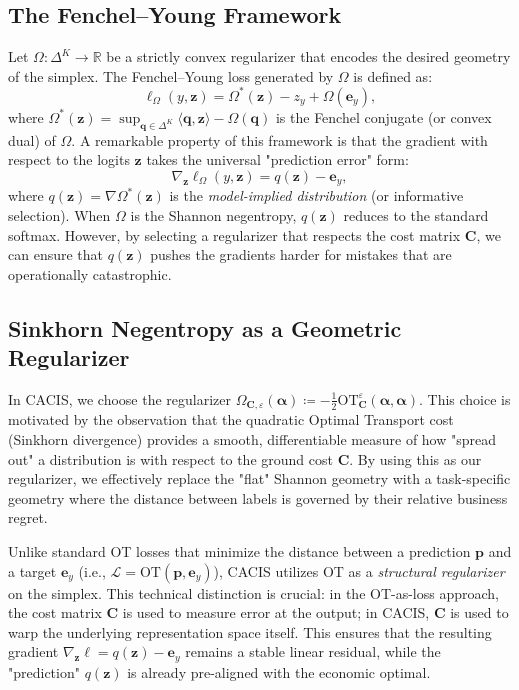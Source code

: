 \documentclass[sigconf,anonymous]{acmart}
\newcommand{\CACIS}{\textsc{CACIS}}
\newcommand{\vz}{\mathbf{z}}
\newcommand{\vp}{\mathbf{p}}
\newcommand{\vq}{\mathbf{q}}
\newcommand{\valpha}{\bm{\alpha}}
\newcommand{\mC}{\mathbf{C}}
\newcommand{\R}{\mathbb{R}}
\newcommand{\OT}{\mathrm{OT}}
\newcommand{\ve}{\mathbf{e}}
\begin{document}
\subsection{The Fenchel--Young Framework}
Let $\Omega: \Delta^K \to \R$ be a strictly convex regularizer that encodes the desired geometry of the simplex. The Fenchel--Young loss generated by $\Omega$ is defined as:
\begin{equation}
\ell_{\Omega}(y, \vz) = \Omega^*(\vz) - z_y + \Omega(\ve_y),
\end{equation}
where $\Omega^*(\vz) = \sup_{\vq \in \Delta^K} \langle \vq, \vz \rangle - \Omega(\vq)$ is the Fenchel conjugate (or convex dual) of $\Omega$. A remarkable property of this framework is that the gradient with respect to the logits $\vz$ takes the universal "prediction error" form:
\begin{equation}
\nabla_{\vz} \ell_{\Omega}(y, \vz) = q(\vz) - \ve_y,
\end{equation}
where $q(\vz) = \nabla \Omega^*(\vz)$ is the \emph{model-implied distribution} (or informative selection). When $\Omega$ is the Shannon negentropy, $q(\vz)$ reduces to the standard softmax. However, by selecting a regularizer that respects the cost matrix $\mC$, we can ensure that $q(\vz)$ pushes the gradients harder for mistakes that are operationally catastrophic.

\subsection{Sinkhorn Negentropy as a Geometric Regularizer}
In \CACIS{}, we choose the regularizer $\Omega_{\mC, \varepsilon}(\valpha) \coloneqq -\frac{1}{2} \OT^{\varepsilon}_{\mC}(\valpha, \valpha)$. This choice is motivated by the observation that the quadratic Optimal Transport cost (Sinkhorn divergence) provides a smooth, differentiable measure of how "spread out" a distribution is with respect to the ground cost $\mC$. By using this as our regularizer, we effectively replace the "flat" Shannon geometry with a task-specific geometry where the distance between labels is governed by their relative business regret.

Unlike standard OT losses that minimize the distance between a prediction $\vp$ and a target $\ve_y$ (i.e., $\mathcal{L} = \OT(\vp, \ve_y)$), \CACIS{} utilizes OT as a \emph{structural regularizer} on the simplex. This technical distinction is crucial: in the OT-as-loss approach, the cost matrix $\mC$ is used to measure error at the output; in \CACIS{}, $\mC$ is used to warp the underlying representation space itself. This ensures that the resulting gradient $\nabla_{\vz} \ell = q(\vz) - \ve_y$ remains a stable linear residual, while the "prediction" $q(\vz)$ is already pre-aligned with the economic optimal.
\end{document}
